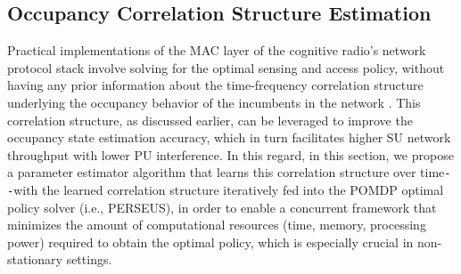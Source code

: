 \documentclass[12pt, draftcls, onecolumn]{IEEEtran}
\begin{document}
\subsection{Occupancy Correlation Structure Estimation}\label{II.I}
Practical implementations of the MAC layer of the cognitive radio's network protocol stack involve solving for the optimal sensing and access policy, without having any prior information about the time-frequency correlation structure underlying the occupancy behavior of the incumbents in the network \cite{WCL:paper}. This correlation structure, as discussed earlier, can be leveraged to improve the occupancy state estimation accuracy, which in turn facilitates higher SU network throughput with lower PU interference. In this regard, in this section, we propose a parameter estimator algorithm that learns this correlation structure over time\texttt{-{}-}with the learned correlation structure iteratively fed into the POMDP optimal policy solver (i.e., PERSEUS), in order to enable a concurrent framework that minimizes the amount of computational resources (time, memory, processing power) required to obtain the optimal policy, which is especially crucial in non-stationary settings.
\end{document}
